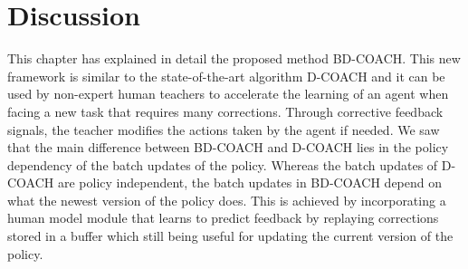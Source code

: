 \section{Discussion}
\label{section:Algorithm-Discussion}
This chapter has explained in detail the proposed method BD-COACH. This new framework is similar to the state-of-the-art algorithm D-COACH and it can be used by non-expert human teachers to accelerate the learning of an agent when facing a new task that requires many corrections. Through corrective feedback signals, the teacher modifies the actions taken by the agent if needed. We saw that the main difference between BD-COACH and D-COACH lies in the policy dependency of the batch updates of the policy. Whereas the batch updates of D-COACH are policy independent, the batch updates in BD-COACH depend on what the newest version of the policy does. This is achieved by incorporating a human model module that learns to predict feedback by replaying corrections stored in a buffer which still being useful for updating the current version of the policy.



